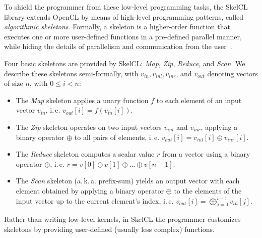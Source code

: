 To shield the programmer from these low-level programming tasks, the SkelCL library extends OpenCL by means of high-level programming patterns, called \emph{algorithmic skeletons}.
Formally, a skeleton is a higher-order function that executes one or more user-defined functions in a pre-defined parallel manner, while hiding the details of parallelism and communication from the user~\cite{RaG-03}.

Four basic skeletons are provided by SkelCL: \emph{Map}, \emph{Zip}, \emph{Reduce}, and \emph{Scan}.
We describe these skeletons semi-formally, with $v_{in}, v_{inl}, v_{inr}$, and $v_{out}$ denoting vectors of size $n$, with $0\leq i<n$:

\begin{itemize}
  \item The \emph{Map} skeleton applies a unary function $f$ to each element of an input vector $v_{in}$, i.\,e. $v_{out}[i] = f(v_{in}[i])$.

  \item The \emph{Zip} skeleton operates on two input vectors $v_{inl}$ and $v_{inr}$, applying a binary operator $\oplus$ to all pairs of elements, i.\,e. $v_{out}[i] = v_{inl}[i] \oplus v_{inr}[i]$.
  
  \item The \emph{Reduce} skeleton computes a scalar value $r$ from a vector using a binary operator $\oplus$, i.\,e. $r = v[0] \oplus v[1] \oplus \ldots \oplus v[n-1]$.

  \item The \emph{Scan} skeleton (a.\,k.\,a. prefix-sum) yields an output vector with each element obtained by applying a binary operator $\oplus$ to the elements of the input vector up to the current element's index, i.\,e. $v_{out}[i] = \bigoplus_{j=0}^{i-1} v_{in}[j]$.
\end{itemize}

Rather than writing low-level kernels, in SkelCL the programmer customizes skeletons by providing user-defined (usually less complex) functions.

